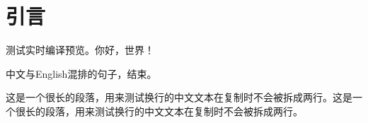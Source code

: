 \documentclass[fontset=fandol]{ctexart}
\begin{document}
\section{引言}
测试实时编译预览。你好，世界！

中文与English混排的句子，结束。

这是一个很长的段落，用来测试换行的中文文本在复制时不会被拆成两行。这是一个很长的段落，用来测试换行的中文文本在复制时不会被拆成两行。
\end{document}

